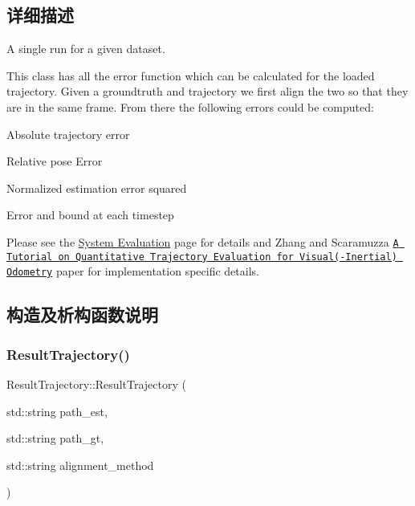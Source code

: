 \subsection{详细描述}
A single run for a given dataset. 

This class has all the error function which can be calculated for the loaded trajectory. Given a groundtruth and trajectory we first align the two so that they are in the same frame. From there the following errors could be computed\+:
\begin{DoxyItemize}
\item Absolute trajectory error
\item Relative pose Error
\item Normalized estimation error squared
\item Error and bound at each timestep
\end{DoxyItemize}

Please see the \hyperlink{evaluation}{System Evaluation} page for details and Zhang and Scaramuzza \href{http://rpg.ifi.uzh.ch/docs/IROS18_Zhang.pdf}{\tt A Tutorial on Quantitative Trajectory Evaluation for Visual(-\/\+Inertial) Odometry} paper for implementation specific details. 

\subsection{构造及析构函数说明}
\mbox{\label{classov__eval_1_1ResultTrajectory_a91d8d079db9f290d384746b7a030e336}} 
\subsubsection{\texorpdfstring{Result\+Trajectory()}{ResultTrajectory()}}
{\footnotesize\ttfamily Result\+Trajectory\+::\+Result\+Trajectory (\begin{DoxyParamCaption}\item[{std\+::string}]{path\+\_\+est,  }\item[{std\+::string}]{path\+\_\+gt,  }\item[{std\+::string}]{alignment\+\_\+method }\end{DoxyParamCaption})}




